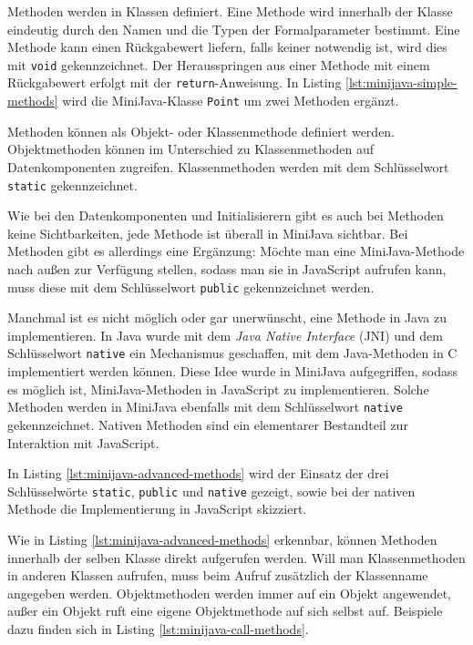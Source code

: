 Methoden werden in Klassen definiert. Eine Methode wird innerhalb der Klasse eindeutig durch den Namen und die Typen der Formalparameter bestimmt. Eine Methode kann einen Rückgabewert liefern, falls keiner notwendig ist, wird dies mit \lstinline{void} gekennzeichnet. Der Herausspringen aus einer Methode mit einem Rückgabewert erfolgt mit der \lstinline{return}-Anweisung. In Listing \ref{lst:minijava-simple-methods} wird die MiniJava-Klasse \lstinline{Point} um zwei Methoden ergänzt.



Methoden können als Objekt- oder Klassenmethode definiert werden. Objektmethoden können im Unterschied zu Klassenmethoden auf Datenkomponenten zugreifen. Klassenmethoden werden mit dem Schlüsselwort \lstinline{static} gekennzeichnet.

Wie bei den Datenkomponenten und Initialisierern gibt es auch bei Methoden keine Sichtbarkeiten, jede Methode ist überall in MiniJava sichtbar. Bei Methoden gibt es allerdings eine Ergänzung: Möchte man eine MiniJava-Methode nach außen zur Verfügung stellen, sodass man sie in JavaScript aufrufen kann, muss diese mit dem Schlüsselwort \lstinline{public} gekennzeichnet werden.

Manchmal ist es nicht möglich oder gar unerwünscht, eine Methode in Java zu implementieren. In Java wurde mit dem \emph{Java Native Interface} (JNI) \cite{JNI8} und dem Schlüsselwort \lstinline{native} ein Mechanismus geschaffen, mit dem Java-Methoden in C implementiert werden können. Diese Idee wurde in MiniJava aufgegriffen, sodass es möglich ist, MiniJava-Methoden in JavaScript zu implementieren. Solche Methoden werden in MiniJava ebenfalls mit dem Schlüsselwort \lstinline{native} gekennzeichnet. Nativen Methoden sind ein elementarer Bestandteil zur Interaktion mit JavaScript.

In Listing \ref{lst:minijava-advanced-methods} wird der Einsatz der drei Schlüsselwörte \lstinline{static}, \lstinline{public} und \lstinline{native} gezeigt, sowie bei der nativen Methode die Implementierung in JavaScript skizziert.



Wie in Listing \ref{lst:minijava-advanced-methods} erkennbar, können Methoden innerhalb der selben Klasse direkt aufgerufen werden. Will man Klassenmethoden in anderen Klassen aufrufen, muss beim Aufruf zusätzlich der Klassenname angegeben werden. Objektmethoden werden immer auf ein Objekt angewendet, außer ein Objekt ruft eine eigene Objektmethode auf sich selbst auf. Beispiele dazu finden sich in Listing \ref{lst:minijava-call-methods}.


